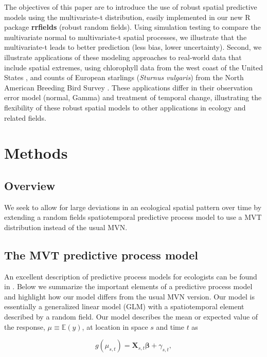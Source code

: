 \documentclass[12pt,english]{article}
\begin{document}
\begin{spacing}{1.25}
The objectives of this paper are to introduce the use of robust spatial
predictive models using the multivariate-t distribution, easily implemented in
our new R package \textbf{rrfields} (robust random fields). Using simulation
testing to compare the multivariate normal to multivariate-t spatial processes,
we illustrate that the multivariate-t leads to better prediction (less bias,
lower uncertainty). Second, we illustrate applications of these modeling
approaches to real-world data that include spatial extremes, using chlorophyll
data from the west coast of the United States \citep{mckibben2012}, and counts
of European starlings (\emph{Sturnus vulgaris}) from the North American
Breeding Bird Survey \citep{pardieck2016}. These applications differ in their
observation error model (normal, Gamma) and treatment of temporal change,
illustrating the flexibility of these robust spatial models to other
applications in ecology and related fields.

\section{Methods}

\subsection{Overview}

We seek to allow for large deviations in an ecological spatial pattern over
time by extending a random fields spatiotemporal predictive process model to
use a MVT distribution instead of the usual MVN.



\subsection{The MVT predictive process model}

An excellent description of predictive process models for ecologists can be
found in \citet{latimer2009}. Below we summarize the important elements of a
predictive process model and highlight how our model differs from the usual MVN
version. Our model is essentially a generalized linear model (GLM) with a
spatiotemporal element described by a random field. Our model describes the
mean or expected value of the response, $\mu \equiv \mathbb{E}(y)$, at location
in space $s$ and time $t$ as

\begin{equation}
  g(\mu_{s,t}) = \bm{X}_{s,t} \bm{\beta} + \gamma_{s,t},
\end{equation}


\end{spacing}
\end{document}
